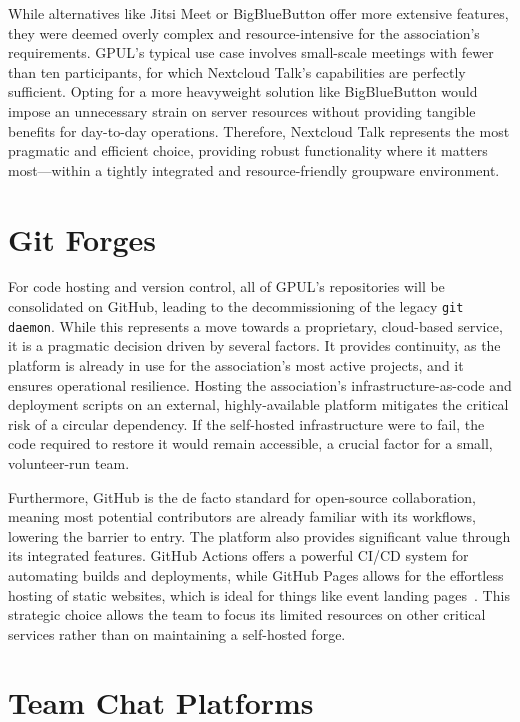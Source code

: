 While alternatives like Jitsi Meet or BigBlueButton offer more extensive features, they were deemed overly complex and resource-intensive for the association's requirements. GPUL's typical use case involves small-scale meetings with fewer than ten participants, for which Nextcloud Talk's capabilities are perfectly sufficient. Opting for a more heavyweight solution like BigBlueButton would impose an unnecessary strain on server resources without providing tangible benefits for day-to-day operations. Therefore, Nextcloud Talk represents the most pragmatic and efficient choice, providing robust functionality where it matters most—within a tightly integrated and resource-friendly groupware environment.

\section{Git Forges}

For code hosting and version control, all of GPUL's repositories will be consolidated on GitHub, leading to the decommissioning of the legacy \texttt{git daemon}. While this represents a move towards a proprietary, cloud-based service, it is a pragmatic decision driven by several factors. It provides continuity, as the platform is already in use for the association's most active projects, and it ensures operational resilience. Hosting the association's infrastructure-as-code and deployment scripts on an external, highly-available platform mitigates the critical risk of a circular dependency. If the self-hosted infrastructure were to fail, the code required to restore it would remain accessible, a crucial factor for a small, volunteer-run team.

Furthermore, GitHub is the de facto standard for open-source collaboration, meaning most potential contributors are already familiar with its workflows, lowering the barrier to entry. The platform also provides significant value through its integrated features. GitHub Actions offers a powerful CI/CD system for automating builds and deployments, while GitHub Pages allows for the effortless hosting of static websites, which is ideal for things like event landing pages~\cite{github-docs}. This strategic choice allows the team to focus its limited resources on other critical services rather than on maintaining a self-hosted forge.

\section{Team Chat Platforms}

